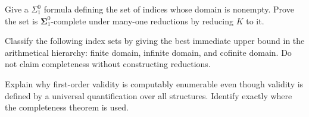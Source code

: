 \begin{exercise}
\label{ex:decision-hierarchy-01}
Give a \(\Sigma^0_1\) formula defining the set of indices whose domain is
nonempty.  Prove the set is \(\boldsymbol{\Sigma}^0_1\)-complete under
many-one reductions by reducing \(K\) to it.
\end{exercise}

\begin{exercise}
\label{ex:decision-hierarchy-02}
Classify the following index sets by giving the best immediate upper bound in
the arithmetical hierarchy: finite domain, infinite domain, and cofinite domain.
Do not claim completeness without constructing reductions.
\end{exercise}

\begin{exercise}
\label{ex:decision-hierarchy-03}
Explain why first-order validity is computably enumerable even though validity
is defined by a universal quantification over all structures.  Identify
exactly where the completeness theorem is used.
\end{exercise}

